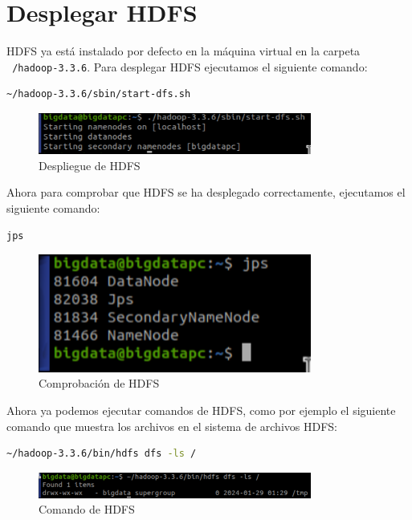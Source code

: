 \chapter{Desplegar HDFS}

HDFS ya está instalado por defecto en la máquina virtual en la carpeta \texttt{~/hadoop-3.3.6}. Para desplegar HDFS ejecutamos el siguiente comando:

\begin{lstlisting}[language=bash]
    ~/hadoop-3.3.6/sbin/start-dfs.sh
\end{lstlisting}

\begin{figure}[H]
    \centering
    \includegraphics[width=0.8\textwidth]{figures/6.png}
    \caption{Despliegue de HDFS}
\end{figure}

Ahora para comprobar que HDFS se ha desplegado correctamente, ejecutamos el siguiente comando:

\begin{lstlisting}[language=bash]
    jps
\end{lstlisting}

\begin{figure}[H]
    \centering
    \includegraphics[width=0.8\textwidth]{figures/7.png}
    \caption{Comprobación de HDFS}
\end{figure}

Ahora ya podemos ejecutar comandos de HDFS, como por ejemplo el siguiente comando que muestra los archivos en el sistema de archivos HDFS:

\begin{lstlisting}[language=bash]
    ~/hadoop-3.3.6/bin/hdfs dfs -ls /
\end{lstlisting}

\begin{figure}[H]
    \centering
    \includegraphics[width=0.8\textwidth]{figures/8.png}
    \caption{Comando de HDFS}
\end{figure}

